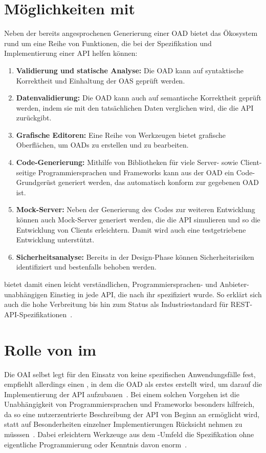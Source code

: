 \section{Möglichkeiten mit \OA}
Neben der bereits angesprochenen Generierung einer \ac{OAD} bietet das Ökosystem rund um \OA eine Reihe von Funktionen, die bei der Spezifikation und Implementierung einer \ac{API} helfen können:
\begin{enumerate}
	\item \textbf{Validierung und statische Analyse:} Die \ac{OAD} kann auf syntaktische Korrektheit und Einhaltung der \ac{OAS} geprüft werden.
	\item \textbf{Datenvalidierung:} Die \ac{OAD} kann auch auf semantische Korrektheit geprüft werden, indem sie mit den tatsächlichen Daten verglichen wird, die die \ac{API} zurückgibt.
	\item \textbf{Grafische Editoren:} Eine Reihe von Werkzeugen bietet grafische Oberflächen, um \acp{OAD} zu erstellen und zu bearbeiten.
	\item \textbf{Code-Generierung:} Mithilfe von Bibliotheken für viele Server- sowie Client-seitige Programmiersprachen und Frameworks kann aus der \ac{OAD} ein Code-Grundgerüst generiert werden, das automatisch konform zur gegebenen \ac{OAD} ist.
	\item \textbf{Mock-Server:} Neben der Generierung des Codes zur weiteren Entwicklung können auch Mock-Server generiert werden, die die \ac{API} simulieren und so die Entwicklung von Clients erleichtern. Damit wird auch eine testgetriebene Entwicklung unterstützt.
	\item \textbf{Sicherheitsanalyse:} Bereits in der Design-Phase können Sicherheitsrisiken identifiziert und bestenfalls behoben werden.
\end{enumerate}\cite{ope23}

\OA bietet damit einen leicht verständlichen, Programmiersprachen- und Anbieter-unabhängigen Einstieg in jede \ac{API}, die nach ihr spezifiziert wurde.
So erklärt sich auch die hohe Verbreitung bis hin zum Status als Industriestandard für \acs{REST}-\acs{API}-Spezifikationen~\cite{ope}.

\section{Rolle von \OA im \AFA}
Die \ac{OAI} selbst legt für den Einsatz von \OA keine spezifischen Anwendungsfälle fest, empfiehlt allerdings einen \AFA, in dem die \ac{OAD} als erstes erstellt wird, um darauf die Implementierung der \ac{API} aufzubauen~\cites{ope,ope24}.
Bei einem solchen Vorgehen ist die Unabhängigkeit von Programmiersprachen und Frameworks besonders hilfreich, da so eine nutzerzentrierte Beschreibung der \ac{API} von Beginn an ermöglicht wird, statt auf Besonderheiten einzelner Implementierungen Rücksicht nehmen zu müsssen~\cite{ope}.
Dabei erleichtern Werkzeuge aus dem \OA-Umfeld die Spezifikation ohne eigentliche Programmierung oder Kenntnis davon enorm~\cites[1629]{cha21}{ope24}.

